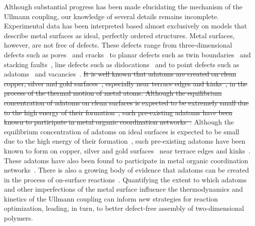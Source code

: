 \documentclass[aps,prb,amsmath,amssymb,11pt]{revtex4-1}
\newcommand{\zhzh}{\color{blue}}
\newcommand{\zhzh}{\color{blue}}
\begin{document}
Although substantial progress has been made elucidating the mechanism of the Ullmann coupling, our knowledge of several details remains incomplete. Experimental data has been interpreted based almost exclusively on models that describe metal surfaces as ideal, perfectly ordered structures. 
%
Metal surfaces, however, are not free of defects. These defects range from three-dimensional defects such as pores~\cite{ullmann_72} and cracks~\cite{ullmann_73} to planar defects such as twin boundaries~\cite{ullmann_74} and stacking faults~\cite{ullmann_75}, line defects such as dislocations~\cite{Ullmann_76} and to point defects such as adatoms~\cite{Ullmann_77} and vacancies~\cite{ullmann_78}.
%
\sout{It is well known that adatoms are created on clean copper, silver and gold surfaces~\cite{ullmann_79, ullmann_58}, especially near terrace edges and kinks~\cite{ullmann_84, ullmann_85}, in the process of the thermal motion of metal atoms. 
Although the equilibrium concentration of adatoms on clean surfaces is expected to be extremely small due to the high energy of their formation~\cite{chemeurope2017}, such pre-existing adatoms have been known to participate in metal organic coordination networks~\cite{ullmann_80, ullmann_81, ullmann_82, ullmann_83}.}
{\zhzh Although the equilibrium concentration of adatoms on ideal surfaces is expected to be  small due to the high energy of their formation~\cite{chemeurope2017}, such pre-existing adatoms have been known to form on copper, silver and gold surfaces~\cite{ullmann_79, ullmann_58} near terrace edges and kinks~\cite{ullmann_84, ullmann_85, ullmann_171}. These adatoms have also been found to participate in metal organic coordination networks~\cite{ullmann_80, ullmann_81, ullmann_82, ullmann_83, ullmann_170}.}
There is also a growing body of evidence that adatoms can be created in the process of on-surface reactions~\cite{ullmann_146, ullmann_53, chematerial2019, ullmann_147, chemeurope2017, ullmann_98, ullmann_91}. %
Quantifying the extent to which adatoms and other imperfections of the metal surface influence the thermodynamics and kinetics of the Ullmann coupling can inform new strategies for reaction optimization, leading, in turn, to better defect-free assembly of two-dimensional polymers. 
\end{document}
